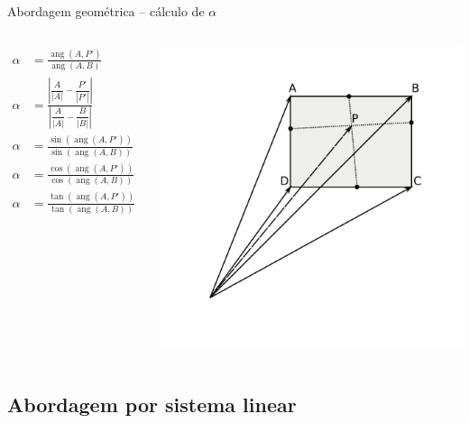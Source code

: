 \documentclass{beamer}
\DeclareMathOperator{\angulo}{ang}
\begin{document}
\begin{frame}{Abordagem geométrica -- cálculo de $\alpha$}
	\begin{columns}
		\begin{align*}
		\alpha & = \frac{\angulo(A, P')}{\angulo(A, B)} \\
		\alpha & = \frac{
				\left| \dfrac{A}{|A|} - \dfrac{P'}{|P'|} \right|
			}{
				\left| \dfrac{A}{|A|} - \dfrac{B }{|B |} \right|
			}  \\
		\alpha & = \frac{\sin(\angulo(A, P'))}{\sin(\angulo(A, B))} \\
		\alpha & = \frac{\cos(\angulo(A, P'))}{\cos(\angulo(A, B))} \\
		\alpha & = \frac{\tan(\angulo(A, P'))}{\tan(\angulo(A, B))}
		\end{align*}

		\includegraphics[keepaspectratio, width=1.0\textwidth, height=0.8\textheight, clip, trim=0.75in 0.75in 0.70in 0.50in]{../monografia/img/geometria_ABCD2.pdf}
	\end{columns}
\end{frame}


\subsection{Abordagem por sistema linear}
\end{document}

